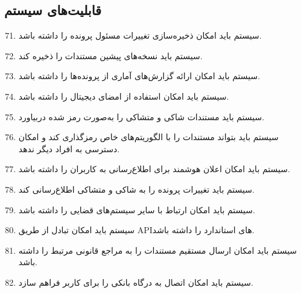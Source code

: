 \documentclass[12pt,a4paper,oneside]{article}
\begin{document}
	\subsection*{قابلیت‌های سیستم}
	
	\begin{enumerate}[label=.R\arabic*]
		\setcounter{enumi}{70}
		\item سیستم باید امکان ذخیره‌سازی تغییرات مسئول پرونده را داشته باشد.
		\item سیستم باید نسخه‌های پیشین مستندات را ذخیره کند.
		\item سیستم باید امکان ارائه گزارش‌های آماری از پرونده‌ها را داشته باشد.
		\item سیستم باید امکان استفاده از امضای دیجیتال را داشته باشد.
		\item سیستم باید مستندات شاکی و متشاکی را به‌صورت رمز شده دربیاورد.
		\item سیستم باید بتواند مستندات را با الگوریتم‌های خاص رمزگذاری کند و امکان دسترسی به افراد دیگر ندهد.
		\item سیستم باید امکان اعلان هوشمند برای اطلاع‌رسانی به کاربران را داشته باشد.
		\item سیستم باید تغییرات پرونده را به شاکی و متشاکی اطلاع‌رسانی کند.
		\item سیستم باید امکان ارتباط با سایر سیستم‌های قضایی را داشته باشد.
		\item سیستم باید امکان تبادل از طریق APIهای استاندارد را داشته باشد.
		\item سیستم باید امکان ارسال مستقیم مستندات را به مراجع قانونی مرتبط را داشته باشد.
		\item سیستم باید امکان اتصال به درگاه بانکی را برای کاربر فراهم سازد.
	\end{enumerate}
\end{document}
